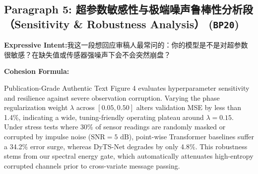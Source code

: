 \subsection*{Paragraph 5: 超参数敏感性与极端噪声鲁棒性分析段（Sensitivity \& Robustness Analysis） (\texttt{BP20})}
\noindent\textbf{Expressive Intent:}\enspace 我这一段想回应审稿人最常问的：你的模型是不是对超参数很敏感？在缺失值或传感器强噪声下会不会突然崩盘？\par
\noindent\textbf{Cohesion Formula:}\par\vspace{4pt}
\begin{ExampleBox}{Publication-Grade Authentic Text}
Figure 4 evaluates hyperparameter sensitivity and resilience against severe observation corruption. Varying the phase regularization weight $\lambda$ across $[0.05, 0.50]$ alters validation MSE by less than 1.4\%, indicating a wide, tuning-friendly operating plateau around $\lambda=0.15$. Under stress tests where 30\% of sensor readings are randomly masked or corrupted by impulse noise ($\text{SNR} = 5\text{ dB}$), point-wise Transformer baselines suffer a 34.2\% error surge, whereas DyTS-Net degrades by only 4.8\%. This robustness stems from our spectral energy gate, which automatically attenuates high-entropy corrupted channels prior to cross-variate message passing.
\end{ExampleBox}
